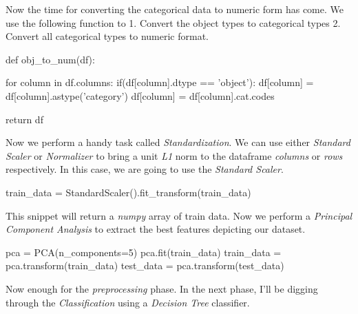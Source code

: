 \documentclass[12pt]{article}
\numberwithin{equation}{section}
\numberwithin{table}{section}
\numberwithin{figure}{section}
\begin{document}
Now the time for converting the categorical data to numeric form has come. We use the following function to 1. Convert the object types to categorical types 2. Convert all categorical types to numeric format.
\begin{python}
	def obj_to_num(df):
	
	for column in df.columns:
		if(df[column].dtype == 'object'):
			df[column] = df[column].astype('category')
			df[column] = df[column].cat.codes
	
	return df
\end{python} 
Now we perform a handy task called \textit{Standardization}. We can use either \textit{Standard Scaler} or \textit{Normalizer} to bring a unit \textit{L1} norm to the dataframe \textit{columns} or \textit{rows} respectively. In this case, we are going to use the \textit{Standard Scaler}.
\begin{python}
	train_data = StandardScaler().fit_transform(train_data)
\end{python}
This snippet will return a \textit{numpy} array of train data. Now we perform a \textit{Principal Component Analysis} to extract the best features depicting our dataset.
\begin{python}
	pca = PCA(n_components=5)
	pca.fit(train_data)
	train_data = pca.transform(train_data)
	test_data = pca.transform(test_data)
\end{python}
Now enough for the \textit{preprocessing} phase. In the next phase, I'll be digging through the \textit{Classification} using a \textit{Decision Tree} classifier.
\end{document}

